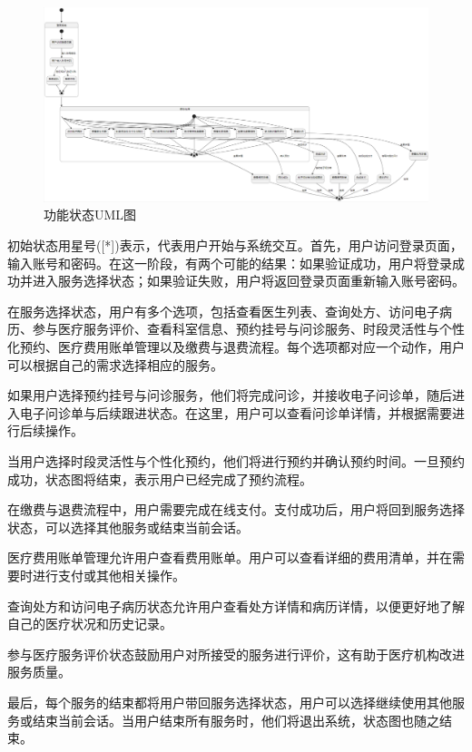 \begin{figure}[htbp]
	\centering
	\includegraphics[width=\textwidth]{figures/05.png}
	\caption{功能状态UML图}
	\label{fig:functional_state_diagram}
\end{figure}

初始状态用星号([*])表示，代表用户开始与系统交互。首先，用户访问登录页面，输入账号和密码。在这一阶段，有两个可能的结果：如果验证成功，用户将登录成功并进入服务选择状态；如果验证失败，用户将返回登录页面重新输入账号密码。

在服务选择状态，用户有多个选项，包括查看医生列表、查询处方、访问电子病历、参与医疗服务评价、查看科室信息、预约挂号与问诊服务、时段灵活性与个性化预约、医疗费用账单管理以及缴费与退费流程。每个选项都对应一个动作，用户可以根据自己的需求选择相应的服务。

如果用户选择预约挂号与问诊服务，他们将完成问诊，并接收电子问诊单，随后进入电子问诊单与后续跟进状态。在这里，用户可以查看问诊单详情，并根据需要进行后续操作。

当用户选择时段灵活性与个性化预约，他们将进行预约并确认预约时间。一旦预约成功，状态图将结束，表示用户已经完成了预约流程。

在缴费与退费流程中，用户需要完成在线支付。支付成功后，用户将回到服务选择状态，可以选择其他服务或结束当前会话。

医疗费用账单管理允许用户查看费用账单。用户可以查看详细的费用清单，并在需要时进行支付或其他相关操作。

查询处方和访问电子病历状态允许用户查看处方详情和病历详情，以便更好地了解自己的医疗状况和历史记录。

参与医疗服务评价状态鼓励用户对所接受的服务进行评价，这有助于医疗机构改进服务质量。

最后，每个服务的结束都将用户带回服务选择状态，用户可以选择继续使用其他服务或结束当前会话。当用户结束所有服务时，他们将退出系统，状态图也随之结束。

